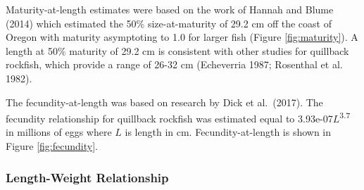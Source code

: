 \documentclass[11pt,
  english,
  a4paper,
]{article}
\begin{document}
\leavevmode\tagmcend\tagstructend


Maturity-at-length estimates were based on the work of Hannah and Blume {(2014)\leavevmode\tagmcend\tagstructend} which estimated the 50\% size-at-maturity of 29.2 cm off the coast of Oregon with maturity asymptoting to 1.0 for larger fish (Figure \ref{fig:maturity}). A length at 50\% maturity of 29.2 cm is consistent with other studies for quillback rockfish, which provide a range of 26-32 cm {(Echeverria 1987; Rosenthal et al. 1982)\leavevmode\tagmcend\tagstructend}.

\leavevmode\tagmcend\tagstructend\par


The fecundity-at-length was based on research by Dick et al.~{(2017)\leavevmode\tagmcend\tagstructend}. The fecundity relationship for quillback rockfish was estimated equal to 3.93e-07{\(L\)\leavevmode\tagmcend\tagstructend}\textsuperscript{3.7} in millions of eggs where {\(L\)\leavevmode\tagmcend\tagstructend} is length in cm. Fecundity-at-length is shown in Figure \ref{fig:fecundity}.

\leavevmode\tagmcend\tagstructend\par


\hypertarget{length-weight-relationship}{%
\subsubsection{Length-Weight Relationship}\label{length-weight-relationship}}

\leavevmode\tagmcend\tagstructend

\end{document}
